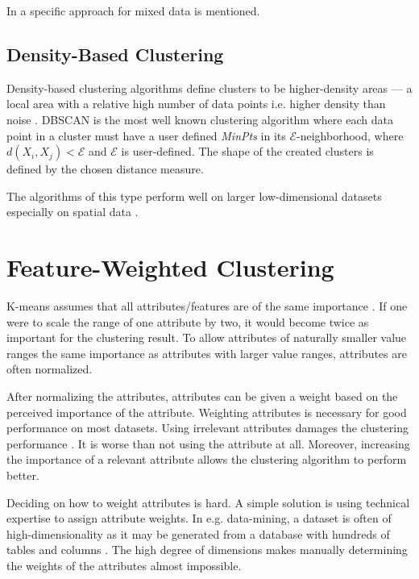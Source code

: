 \documentclass[../report.tex]{subfiles}
\begin{document}
In \cite{Jia2018} a specific approach for mixed data is mentioned.


\subsection{Density-Based Clustering}
\label{sub:density}
Density-based clustering algorithms define clusters to be higher-density areas --- a local area with a relative high number of data points i.e. higher density than noise  \cite{Ester1996, huang2005automated, Xu2015,Jain1999}. DBSCAN \cite{Ester1996} is the most well known clustering algorithm where each data point in a cluster must have a user defined \textit{MinPts} in its $\mathcal{E}$-neighborhood, where $d(X_i,X_j) < \mathcal{E}$ and $\mathcal{E}$ is user-defined. The shape of the created clusters is defined by the chosen distance measure.

The algorithms of this type perform well on larger low-dimensional datasets especially on spatial data \cite{Ester1996}.

\section{Feature-Weighted Clustering}
\label{ch:weighed}

K-means assumes that all attributes/features are of the same importance \cite{Kaufman1990}. If one were to scale the range of one attribute by two, it would become twice as important for the clustering result. To allow attributes of naturally smaller value ranges the same importance as attributes with larger value ranges, attributes are often normalized.

After normalizing the attributes, attributes can be given a weight based on the perceived importance of the attribute. Weighting attributes is necessary for good performance on most datasets. Using irrelevant attributes damages the clustering performance \cite{Kaufman1990}. It is worse than not using the attribute at all. Moreover, increasing the importance of a relevant attribute allows the clustering algorithm to perform better. %

Deciding on how to weight attributes is hard. A simple solution is using technical expertise to assign attribute weights. In e.g. data-mining, a dataset is often of high-dimensionality as it may be generated from a database with hundreds of tables and columns \cite{Jing2007}. The high degree of dimensions makes manually determining the weights of the attributes almost impossible.
\end{document}
